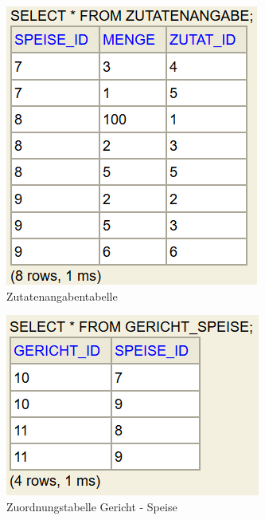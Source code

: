 \begin{figure}[H]
\centering
\includegraphics{ms1/screenshots/angabe_tbl.PNG}
\caption{Zutatenangabentabelle}
\end{figure}

\begin{figure}[H]
\centering
\includegraphics{ms1/screenshots/gericht_speise_tbl.PNG}
\caption{Zuordnungstabelle Gericht - Speise}
\end{figure}


